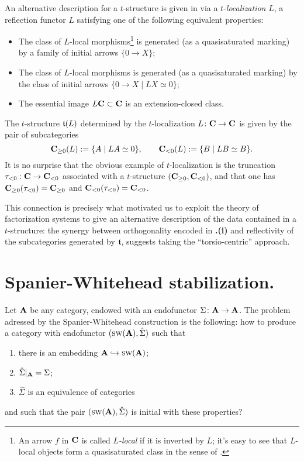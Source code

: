 \begin{remark}
An alternative description for a $t$\hyp{}structure is given in \cite[Prop. \textbf{1.2.1.16}]{LurieHA} via a $t$\hyp{}\emph{localization} $L$, \ie a reflection functor $L$ satisfying one of the following equivalent properties:
\begin{itemize}
\item The class of $L$\hyp{}local morphisms\footnote{An arrow $f$ in $\mathbf{C}$ is called \emph{$L$\hyp{}local} if it is inverted by $L$; it's easy to see that $L$\hyp{}local objects form a quasisaturated class in the sense of \cite[Def. \textbf{1.2.1.14}]{LurieHA}.} is generated (as a quasisaturated marking) by a family of initial arrows $\{0\to X\}$;
\item The class of $L$\hyp{}local morphisms is generated (as a quasisaturated marking) by the class of initial arrows $\{0\to X\mid LX\simeq 0\}$; 
\item The essential image $L\mathbf{C}\subset\mathbf{C}$ is an extension\hyp{}closed class.
\end{itemize}
The $t$\hyp{}structure $\mathfrak{t}(L)$ determined by the $t$\hyp{}localization $L\colon \mathbf{C}\to \mathbf{C}$ is given by the pair of subcategories
\[
\mathbf{C}_{\ge 0}(L) := \{A\mid LA\simeq 0\},\qquad \mathbf{C}_{<0}(L) := \{B\mid LB\simeq B\} .
\]
It is no surprise that the obvious example of $t$\hyp{}localization is the truncation $\tau_{<0}:\mathbf{C}\to\mathbf{C}_{<0}$ associated with a $t$\hyp{}structure $(\mathbf{C}_{\geq0},\mathbf{C}_{<0})$, and that one has $\mathbf{C}_{\ge 0}(\tau_{<0})=\mathbf{C}_{\ge 0}$ and $\mathbf{C}_{< 0}(\tau_{<0})=\mathbf{C}_{< 0}$.
\end{remark}
This connection is precisely what motivated us to exploit the theory of factorization systems to give an alternative description of the data contained in a $t$\hyp{}structure: the synergy between orthogonality encoded in \textbf{.(i)} and reflectivity of the subcategories generated by $\mathfrak{t}$, suggests taking the ``torsio\hyp{}centric'' approach.
\section{Spanier\hyp{}Whitehead stabilization.}\label{spanierwhite}
Let $\mathbf{A}$ be any category, endowed with an endofunctor $\Sigma\colon \mathbf{A}\to \mathbf{A}$. The problem adressed by the Spanier\hyp{}Whitehead construction is the following: how to produce a category with endofunctor $(\text{\scshape sw}(\mathbf{A}), \hat \Sigma)$ such that 
\begin{enumerate}
\item there is an embedding $\mathbf{A} \hookrightarrow \text{\scshape sw}(\mathbf{A})$; 
\item $\hat \Sigma|_{\mathbf{A}} = \Sigma$;
\item $\hat \Sigma$ is an equivalence of categories
\end{enumerate}
and such that the pair $(\text{\scshape sw}(\mathbf{A}), \hat \Sigma)$ is initial with these properties?

